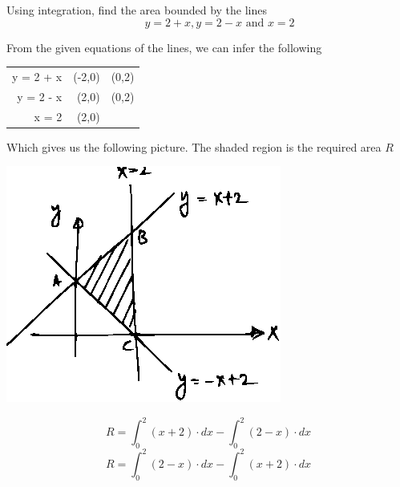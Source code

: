 \documentclass[14pt,fleqn]{extarticle}
\begin{document}
\begin{problem}
	\statement 
    
    Using integration, find the area bounded by the lines 
    \[\qquad  y = 2 + x, y = 2 - x\text{ and } x = 2 \]
          
    \begin{step}

	\begin{options}
	\end{options} 
     \reason 
     
     From the given equations of the lines, we can infer the following 
     \begin{center}
  \begin{tabular}{NNN}
   \toprule
        &  &   \\
   \midrule 
   y = 2 + x & (-2,0) & (0,2) \\
    \midrule 
    y = 2 - x & (2,0) & (0,2) \\
    \midrule 
    x = 2 & (2,0) &  \\ 
    \bottomrule
  \end{tabular}
\end{center}

Which gives us the following picture. The shaded region is the required area $R$ 
\begin{center}
\includegraphics[scale=1.4]{figure.eps}
\end{center}
       
\end{step}

\begin{step}
  \begin{options} 
     \correct 
       
       \[ R = \int_0^2 \left(x+2 \right)\cdot dx - \int_0^2 \left(2-x \right)\cdot dx \]
     \incorrect
\[ R = \int_0^2 \left(2-x \right)\cdot dx - \int_0^2 \left(x+2 \right)\cdot dx \]
        

\end{options}
\end{step}
\end{problem}
\end{document}
